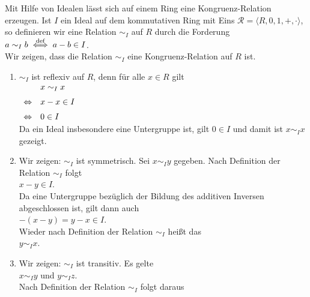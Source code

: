 Mit Hilfe von Idealen lässt sich auf einem Ring eine Kongruenz-Relation erzeugen.  Ist $I$ ein Ideal auf
dem kommutativen Ring mit Eins $\mathcal{R} = \langle R, 0, 1, +, \cdot \rangle$, so definieren wir eine Relation $\sim_I$ auf
$R$ durch die Forderung
\\[0.2cm]
\hspace*{1.3cm}
$a \sim_I b \;\stackrel{\mbox{\scriptsize def}}{\Longleftrightarrow}\; a - b \in I$.
\\[0.2cm]
Wir zeigen, dass die Relation $\sim_I$ eine Kongruenz-Relation auf $R$ ist.
\begin{enumerate}
\item $\sim_I$ ist reflexiv auf $R$, denn für alle $x \in R$ gilt
      \\[0.2cm]
      \hspace*{1.3cm}
      $
      \begin{array}[t]{cl}
                      & x \sim_I x   \\[0.2cm] 
      \Leftrightarrow & x - x \in I  \\[0.2cm] 
      \Leftrightarrow & 0 \in I  
      \end{array}
      $
      \\[0.2cm]
      Da ein Ideal insbesondere eine Untergruppe ist, gilt $0 \in I$ und damit ist $x \sim_I x$
      gezeigt. \checkmark
\item Wir zeigen: $\sim_I$ ist symmetrisch.  Sei $x \sim_I y$ gegeben.  Nach Definition der
      Relation $\sim_I$ folgt  
      \\[0.2cm]
      \hspace*{1.3cm}
      $x - y \in I$.
      \\[0.2cm]
      Da eine Untergruppe bezüglich der Bildung des additiven Inversen abgeschlossen ist, gilt dann auch
      \\[0.2cm]
      \hspace*{1.3cm}
      $-(x - y) = y - x \in I$.
      \\[0.2cm]
      Wieder nach Definition der Relation $\sim_I$ heißt das 
      \\[0.2cm]
      \hspace*{1.3cm}
      $y \sim_I x$.  
      \checkmark
\item Wir zeigen: $\sim_I$ ist transitiv.  Es gelte
      \\[0.2cm]
      \hspace*{1.3cm}
      $x \sim_I y$ \quad und \quad $y \sim_I z$.
      \\[0.2cm]
      Nach Definition der Relation $\sim_I$ folgt daraus
      \\[0.2cm]

\end{enumerate}
